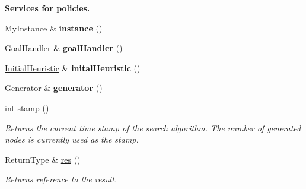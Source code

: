 \begin{Indent}{\bf Services for policies.}\par
\begin{DoxyCompactItemize}
\item 
My\+Instance \& {\bfseries instance} ()\hypertarget{structslb_1_1ext_1_1algorithm_1_1Algorithm_a12672baeccfa80b4e58507fcce64cb03}{}\label{structslb_1_1ext_1_1algorithm_1_1Algorithm_a12672baeccfa80b4e58507fcce64cb03}

\item 
\hyperlink{structslb_1_1ext_1_1algorithm_1_1Algorithm_ae0c6a75028107e4642e43798f21f4bfc}{Goal\+Handler} \& {\bfseries goal\+Handler} ()\hypertarget{structslb_1_1ext_1_1algorithm_1_1Algorithm_a02c455c8bb8d23a1b57d2031c1dc7765}{}\label{structslb_1_1ext_1_1algorithm_1_1Algorithm_a02c455c8bb8d23a1b57d2031c1dc7765}

\item 
\hyperlink{structslb_1_1ext_1_1algorithm_1_1Algorithm_ad1f8f28e7b07f747ef7b7b5bf0643c2d}{Initial\+Heuristic} \& {\bfseries inital\+Heuristic} ()\hypertarget{structslb_1_1ext_1_1algorithm_1_1Algorithm_aacffe484619751d9d15ffa36801d5243}{}\label{structslb_1_1ext_1_1algorithm_1_1Algorithm_aacffe484619751d9d15ffa36801d5243}

\item 
\hyperlink{structslb_1_1ext_1_1algorithm_1_1Algorithm_afa5a78c048b4fe4f5848aeaf5c1f8d65}{Generator} \& {\bfseries generator} ()\hypertarget{structslb_1_1ext_1_1algorithm_1_1Algorithm_a7d3fb914e7abe4758a17ba29b6ff9e51}{}\label{structslb_1_1ext_1_1algorithm_1_1Algorithm_a7d3fb914e7abe4758a17ba29b6ff9e51}

\item 
int \hyperlink{structslb_1_1ext_1_1algorithm_1_1Algorithm_ae8584fe237904c9e6f3b88adab11032a}{stamp} ()
\begin{DoxyCompactList}\small\item\em Returns the current time stamp of the search algorithm. The number of generated nodes is currently used as the stamp. \end{DoxyCompactList}\item 
Return\+Type \& \hyperlink{structslb_1_1ext_1_1algorithm_1_1Algorithm_a263f4d05670e313ee8660e872dae4462}{res} ()
\begin{DoxyCompactList}\small\item\em Returns reference to the result. \end{DoxyCompactList}\end{DoxyCompactItemize}
\end{Indent}
